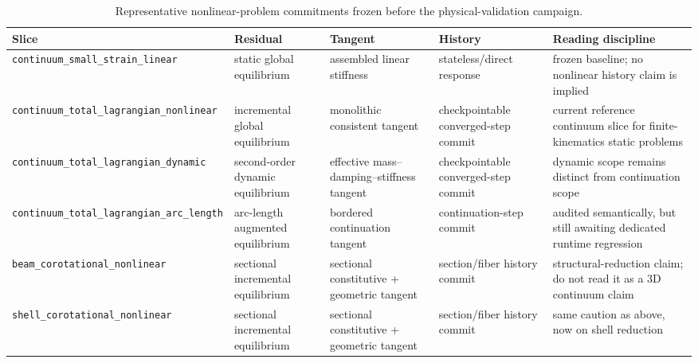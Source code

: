 \begin{table}[htbp]
  \centering
  \caption{Representative nonlinear-problem commitments frozen before the
  physical-validation campaign.}
  \label{tab:stage1-claim-commitments}
  \small
  \begin{tabularx}{\textwidth}{@{}p{}p{}p{}p{}X@{}}
    \toprule
    \textbf{Slice} & \textbf{Residual} & \textbf{Tangent}
    & \textbf{History} & \textbf{Reading discipline} \\
    \midrule
    \texttt{continuum\_small\_strain\_linear}
    & static global equilibrium
    & assembled linear stiffness
    & stateless/direct response
    & frozen baseline; no nonlinear history claim is implied \\[1mm]

    \texttt{continuum\_total\_lagrangian\_nonlinear}
    & incremental global equilibrium
    & monolithic consistent tangent
    & checkpointable converged-step commit
    & current reference continuum slice for finite-kinematics static problems \\[1mm]

    \texttt{continuum\_total\_lagrangian\_dynamic}
    & second-order dynamic equilibrium
    & effective mass--damping--stiffness tangent
    & checkpointable converged-step commit
    & dynamic scope remains distinct from continuation scope \\[1mm]

    \texttt{continuum\_total\_lagrangian\_arc\_length}
    & arc-length augmented equilibrium
    & bordered continuation tangent
    & continuation-step commit
    & audited semantically, but still awaiting dedicated runtime regression \\[1mm]

    \texttt{beam\_corotational\_nonlinear}
    & sectional incremental equilibrium
    & sectional constitutive + geometric tangent
    & section/fiber history commit
    & structural-reduction claim; do not read it as a 3D continuum claim \\[1mm]

    \texttt{shell\_corotational\_nonlinear}
    & sectional incremental equilibrium
    & sectional constitutive + geometric tangent
    & section/fiber history commit
    & same caution as above, now on shell reduction \\ 
    \bottomrule
  \end{tabularx}
\end{table}

